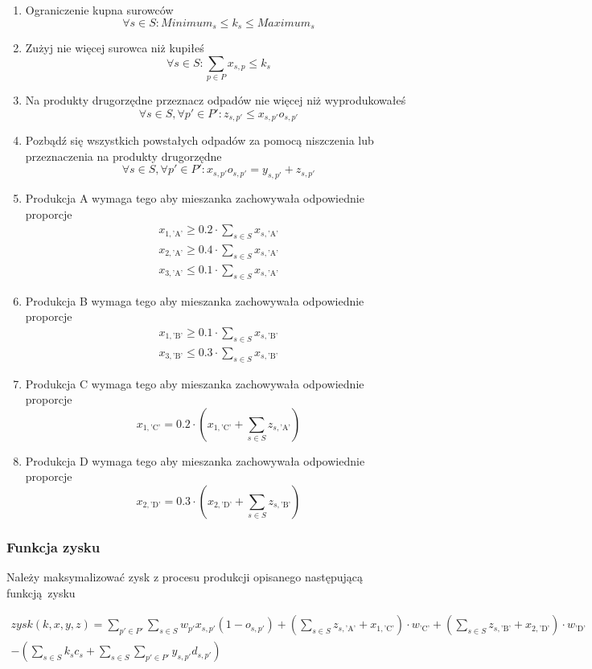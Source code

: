 \documentclass[a4paper,11pt]{article}
\theoremstyle{mytheor}
\begin{document}
\begin{enumerate}
    \item Ograniczenie kupna surowców
    $$
        \forall s\in S: \textit{Minimum}_s \leq k_s \leq \textit{Maximum}_s
    $$
    \item Zużyj nie więcej surowca niż kupiłeś
    $$
        \forall s\in S: \sum_{p\in P} x_{s,p} \leq k_{s}
    $$
    \item Na produkty drugorzędne przeznacz odpadów nie więcej niż wyprodukowałeś
    $$
        \forall s\in S, \forall p'\in P': z_{s, p'} \leq x_{s,p'}o_{s,p'}
    $$
    \item Pozbądź się wszystkich powstałych odpadów za pomocą niszczenia lub przeznaczenia na produkty drugorzędne
    $$
        \forall s\in S, \forall p'\in P': x_{s,p'}o_{s,p'} = y_{s,p'} + z_{s,p'}
    $$
    \item Produkcja A wymaga tego aby mieszanka zachowywała odpowiednie proporcje
    \begin{gather*}
        x_{1, \text{'A'}} \geq 0.2 \cdot \sum_{s\in S} x_{s,\text{'A'}} \\
        x_{2, \text{'A'}} \geq 0.4 \cdot \sum_{s\in S} x_{s,\text{'A'}} \\
        x_{3, \text{'A'}} \leq 0.1 \cdot \sum_{s\in S} x_{s,\text{'A'}}
    \end{gather*}
    \item Produkcja B wymaga tego aby mieszanka zachowywała odpowiednie proporcje
    \begin{gather*}
        x_{1, \text{'B'}} \geq 0.1 \cdot \sum_{s\in S} x_{s,\text{'B'}} \\
        x_{3, \text{'B'}} \leq 0.3 \cdot \sum_{s\in S} x_{s,\text{'B'}}
    \end{gather*}
    \item Produkcja C wymaga tego aby mieszanka zachowywała odpowiednie proporcje
    $$
        x_{1, \text{'C'}} = 0.2 \cdot (x_{1, \text{'C'}} + \sum_{s\in S} z_{s,\text{'A'}})
    $$
    \item Produkcja D wymaga tego aby mieszanka zachowywała odpowiednie proporcje
    $$
        x_{2, \text{'D'}} = 0.3 \cdot (x_{2, \text{'D'}} + \sum_{s\in S} z_{s,\text{'B'}})
    $$
\end{enumerate}

\subsubsection*{Funkcja zysku}
Należy maksymalizować zysk z procesu produkcji opisanego następującą funkcją zysku

\begin{multline*}
    zysk(k, x, y, z) = \sum_{p'\in P'} \sum_{s \in S} w_{p'} x_{s, p'} (1 - o_{s, p'}) + (\sum_{s\in S} z_{s, \text{'A'}} + x_{1, \text{'C'}}) \cdot w_{\text{'C'}} + (\sum_{s\in S} z_{s, \text{'B'}} + x_{2, \text{'D'}}) \cdot w_{\text{'D'}} \\
    - (
        \sum_{s\in S} k_s c_s + \sum_{s\in S} \sum_{p'\in P'} y_{s,p'}d_{s,p'}
    )
\end{multline*}
\end{document}
